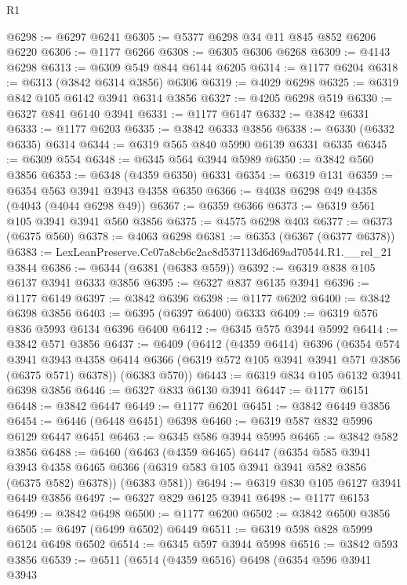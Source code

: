 \begin{lexlean}{R1}
\begin{coremodule}
@6298 := @6297 @6241
@6305 := @5377 @6298 @34 @11 @845 @852 @6206 @6220
@6306 := @1177 @6266
@6308 := @6305 @6306 @6268
@6309 := @4143 @6298
@6313 := @6309 @549 @844 @6144 @6205
@6314 := @1177 @6204
@6318 := @6313 (@3842 @6314 @3856) @6306
@6319 := @4029 @6298
@6325 := @6319 @842 @105 @6142 @3941 @6314 @3856
@6327 := @4205 @6298 @519
@6330 := @6327 @841 @6140 @3941
@6331 := @1177 @6147
@6332 := @3842 @6331
@6333 := @1177 @6203
@6335 := @3842 @6333 @3856
@6338 := @6330 (@6332 @6335) @6314
@6344 := @6319 @565 @840 @5990 @6139 @6331 @6335
@6345 := @6309 @554
@6348 := @6345 @564 @3944 @5989
@6350 := @3842 @560 @3856
@6353 := @6348 (@4359 @6350) @6331
@6354 := @6319 @131
@6359 := @6354 @563 @3941 @3943 @4358 @6350
@6366 := @4038 @6298 @49 @4358 (@4043 (@4044 @6298 @49))
@6367 := @6359 @6366
@6373 := @6319 @561 @105 @3941 @3941 @560 @3856
@6375 := @4575 @6298 @403
@6377 := @6373 (@6375 @560)
@6378 := @4063 @6298
@6381 := @6353 (@6367 (@6377 @6378))
@6383 := LexLeanPreserve.Cc07a8cb6c2ac8d537113d6d69ad70544.R1.__rel_21 @3844
@6386 := @6344 (@6381 (@6383 @559))
@6392 := @6319 @838 @105 @6137 @3941 @6333 @3856
@6395 := @6327 @837 @6135 @3941
@6396 := @1177 @6149
@6397 := @3842 @6396
@6398 := @1177 @6202
@6400 := @3842 @6398 @3856
@6403 := @6395 (@6397 @6400) @6333
@6409 := @6319 @576 @836 @5993 @6134 @6396 @6400
@6412 := @6345 @575 @3944 @5992
@6414 := @3842 @571 @3856
@6437 := @6409
    (@6412
      (@4359 @6414)
      @6396
      (@6354
        @574
        @3941
        @3943
        @4358
        @6414
        @6366
        (@6319 @572 @105 @3941 @3941 @571 @3856 (@6375 @571) @6378))
      (@6383 @570))
@6443 := @6319 @834 @105 @6132 @3941 @6398 @3856
@6446 := @6327 @833 @6130 @3941
@6447 := @1177 @6151
@6448 := @3842 @6447
@6449 := @1177 @6201
@6451 := @3842 @6449 @3856
@6454 := @6446 (@6448 @6451) @6398
@6460 := @6319 @587 @832 @5996 @6129 @6447 @6451
@6463 := @6345 @586 @3944 @5995
@6465 := @3842 @582 @3856
@6488 := @6460
    (@6463
      (@4359 @6465)
      @6447
      (@6354
        @585
        @3941
        @3943
        @4358
        @6465
        @6366
        (@6319 @583 @105 @3941 @3941 @582 @3856 (@6375 @582) @6378))
      (@6383 @581))
@6494 := @6319 @830 @105 @6127 @3941 @6449 @3856
@6497 := @6327 @829 @6125 @3941
@6498 := @1177 @6153
@6499 := @3842 @6498
@6500 := @1177 @6200
@6502 := @3842 @6500 @3856
@6505 := @6497 (@6499 @6502) @6449
@6511 := @6319 @598 @828 @5999 @6124 @6498 @6502
@6514 := @6345 @597 @3944 @5998
@6516 := @3842 @593 @3856
@6539 := @6511
    (@6514
      (@4359 @6516)
      @6498
      (@6354
        @596
        @3941
        @3943

\end{coremodule}
\end{lexlean}
